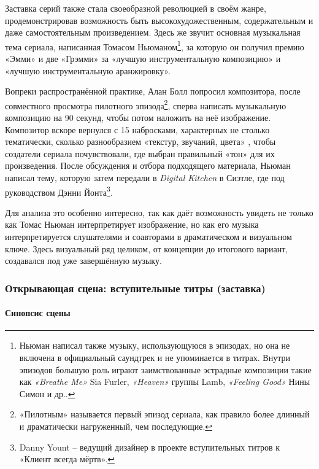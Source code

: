 Заставка серий также стала своеобразной революцией в своём жанре, продемонстрировав возможность быть высокохудожественным, содержательным и даже самостоятельным произведением.
Здесь же звучит основная музыкальная тема сериала, написанная Томасом Ньюманом\footnote{Ньюман написал также музыку, использующуюся в эпизодах, но она не включена в официальный саундтрек и не упоминается в титрах. Внутри эпизодов большую роль играют заимствованные эстрадные композиции такие как \emph{«Breathe Me»} Sia Furler, \emph{«Heaven»} группы Lamb, \emph{«Feeling Good»} Нины Симон и др..}, за которую он получил премию «Эмми» и две «Грэмми» за «лучшую инструментальную композицию» и «лучшую инструментальную аранжировку».

Вопреки распространённой практике, Алан Болл попросил композитора, после совместного просмотра пилотного эпизода\footnote{«Пилотным» называется первый эпизод сериала, как правило более длинный и драматически нагруженный, чем последующие.}, сперва написать музыкальную композицию на 90 секунд, чтобы потом наложить на неё изображение.
Композитор вскоре вернулся с 15 набросками, характерных не столько тематически, сколько разнообразием «текстур, звучаний, цвета» \autocite{TN.SFU.2011}, чтобы создатели сериала почувствовали, где выбран правильный «тон» для их произведения.
После обсуждения и отбора подходящего материала, Ньюман написал тему, которую затем передали в \emph{Digital Kitchen} в Сиэтле, где под руководством Дэнни Йонта\footnote{Danny Yount -- ведущий дизайнер в проекте вступительных титров к «Клиент всегда мёртв».}.

Для анализа это особенно интересно, так как даёт возможность увидеть не только как Томас Ньюман интерпретирует изображение, но как его музыка интерпретируется слушателями и соавторами в драматическом и визуальном ключе.
Здесь визуальный ряд целиком, от концепции до итогового вариант, создавался под уже завершённую музыку.

\subsubsection{Открывающая сцена: вступительные титры (заставка)}\label{ux43eux442ux43aux440ux44bux432ux430ux44eux449ux430ux44f-ux441ux446ux435ux43dux430-ux432ux441ux442ux443ux43fux438ux442ux435ux43bux44cux43dux44bux435-ux442ux438ux442ux440ux44b-ux437ux430ux441ux442ux430ux432ux43aux430}

\paragraph{Синопсис сцены}\label{ux441ux438ux43dux43eux43fux441ux438ux441-ux441ux446ux435ux43dux44b-5}

